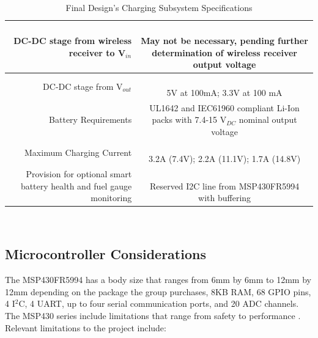 \documentclass[12pt]{article}
\begin{document}
\begin{table}[h!]
\centering
\caption{Final Design's Charging Subsystem  Specifications}
\begin{tabular} {| r | c | }
\hline
\parbox{0.3\linewidth}{\raggedleft DC-DC stage from wireless receiver to V$_{in}$} &   \parbox{0.65\linewidth}{\hfill \\
May not be necessary, pending further determination of wireless receiver output voltage}\\
\hline
\parbox{0.3\linewidth}{\raggedleft DC-DC stage from V$_{out}$} &   \parbox{0.65\linewidth}{\hfill \\
5V at 100mA; 3.3V at 100 mA}\\
\hline
\parbox{0.3\linewidth}{\raggedleft Battery Requirements} &   \parbox{0.65\linewidth}{\hfill \\
UL1642 and IEC61960 compliant Li-Ion packs with 7.4-15 V$_{DC}$ nominal output voltage}\\
\hline
\parbox{0.3\linewidth}{\raggedleft \vspace{0.4em} Maximum Charging Current} &   \parbox{0.65\linewidth}{\hfill \\
3.2A (7.4V); 2.2A (11.1V); 1.7A (14.8V)}\\
\hline
\parbox{0.3\linewidth}{\raggedleft \vspace{0.4em} Provision for optional smart battery health and fuel gauge monitoring} &   \parbox{0.65\linewidth}{\hfill \\
Reserved I2C line from MSP430FR5994 with buffering}\\
\hline
\end{tabular}
\end{table}
\hfill \\

\subsection{Microcontroller Considerations}

\indent \indent
The MSP430FR5994 has a body size that ranges from 6mm by 6mm to 12mm by 12mm depending on the package the group purchases, 8KB RAM, 68 GPIO pins, 4 I$^2$C, 4 UART, up to four serial communication ports, and 20 ADC channels. The MSP430 series include limitations that range from safety to performance \cite{MSP430FR599x}.\\

\noindent
Relevant limitations to the project include:\\
\end{document}
